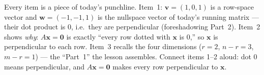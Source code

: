 \documentclass[10pt]{article}
\newcommand{\xx}{\mathbf{x}}
\newcommand{\vv}{\mathbf{v}}
\newcommand{\ww}{\mathbf{w}}
\newcommand{\zero}{\mathbf{0}}
\begin{document}
\begin{teachernote}
Every item is a piece of today's punchline. Item~1: $\vv=(1,0,1)$ is a row-space vector and $\ww=(-1,-1,1)$
is the nullspace vector of today's running matrix --- their dot product is $0$, i.e.\ they are perpendicular
(foreshadowing Part~2). Item~2 shows \emph{why}: $A\xx=\zero$ is exactly ``every row dotted with $\xx$ is
$0$,'' so $\xx$ is perpendicular to each row. Item~3 recalls the four dimensions ($r=2$, $n-r=3$, $m-r=1$) ---
the ``Part~1'' the lesson assembles. Connect items 1--2 aloud: dot $0$ means perpendicular, and $A\xx=\zero$
makes every row perpendicular to $\xx$.
\end{teachernote}
\end{document}
